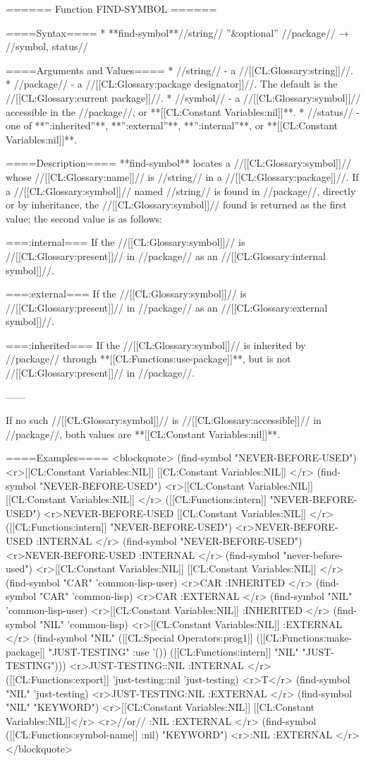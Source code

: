 ====== Function FIND-SYMBOL ======

====Syntax====
* **find-symbol**//string// ''&optional'' //package// → //symbol, status//

====Arguments and Values====
  * //string// - a //[[CL:Glossary:string]]//.
  * //package// - a //[[CL:Glossary:package designator]]//. The default is the //[[CL:Glossary:current package]]//.
  * //symbol// - a //[[CL:Glossary:symbol]]// accessible in the //package//, or **[[CL:Constant Variables:nil]]**.
  * //status// - one of **'':inherited''**, **'':external''**, **'':internal''**, or **[[CL:Constant Variables:nil]]**.

====Description====
**find-symbol** locates a //[[CL:Glossary:symbol]]// whose //[[CL:Glossary:name]]// is //string// in a //[[CL:Glossary:package]]//. If a //[[CL:Glossary:symbol]]// named //string// is found in //package//, directly or by inheritance, the //[[CL:Glossary:symbol]]// found is returned as the first value; the second value is as follows:

===:internal===
If the //[[CL:Glossary:symbol]]// is //[[CL:Glossary:present]]// in //package// as an //[[CL:Glossary:internal symbol]]//.

===:external===
If the //[[CL:Glossary:symbol]]// is //[[CL:Glossary:present]]// in //package// as an //[[CL:Glossary:external symbol]]//.

===:inherited===
If the //[[CL:Glossary:symbol]]// is inherited by //package// through **[[CL:Functions:use-package]]**, but is not //[[CL:Glossary:present]]// in //package//.

------

If no such //[[CL:Glossary:symbol]]// is //[[CL:Glossary:accessible]]// in //package//, both values are **[[CL:Constant Variables:nil]]**.

====Examples====
<blockquote>
(find-symbol "NEVER-BEFORE-USED") <r>[[CL:Constant Variables:NIL]]
[[CL:Constant Variables:NIL]] </r>
(find-symbol "NEVER-BEFORE-USED") <r>[[CL:Constant Variables:NIL]]
[[CL:Constant Variables:NIL]] </r>
([[CL:Functions:intern]] "NEVER-BEFORE-USED") <r>NEVER-BEFORE-USED
[[CL:Constant Variables:NIL]] </r>
([[CL:Functions:intern]] "NEVER-BEFORE-USED") <r>NEVER-BEFORE-USED
:INTERNAL </r>
(find-symbol "NEVER-BEFORE-USED") <r>NEVER-BEFORE-USED
:INTERNAL </r>
(find-symbol "never-before-used") <r>[[CL:Constant Variables:NIL]]
[[CL:Constant Variables:NIL]] </r>
(find-symbol "CAR" 'common-lisp-user) <r>CAR
:INHERITED </r>
(find-symbol "CAR" 'common-lisp) <r>CAR
:EXTERNAL </r>
(find-symbol "NIL" 'common-lisp-user) <r>[[CL:Constant Variables:NIL]]
:INHERITED </r>
(find-symbol "NIL" 'common-lisp) <r>[[CL:Constant Variables:NIL]]
:EXTERNAL </r>
(find-symbol "NIL" 
             ([[CL:Special Operators:prog1]] ([[CL:Functions:make-package]] "JUST-TESTING" :use '()) 
                    ([[CL:Functions:intern]] "NIL" "JUST-TESTING"))) <r>JUST-TESTING::NIL
:INTERNAL </r>
([[CL:Functions:export]] 'just-testing::nil 'just-testing) <r>T</r>
(find-symbol "NIL" 'just-testing) <r>JUST-TESTING:NIL
:EXTERNAL </r>
(find-symbol "NIL" "KEYWORD") <r>[[CL:Constant Variables:NIL]]
[[CL:Constant Variables:NIL]]</r>
<r>//or// :NIL
:EXTERNAL </r>
(find-symbol ([[CL:Functions:symbol-name]] :nil) "KEYWORD") <r>:NIL
:EXTERNAL </r>
</blockquote>

